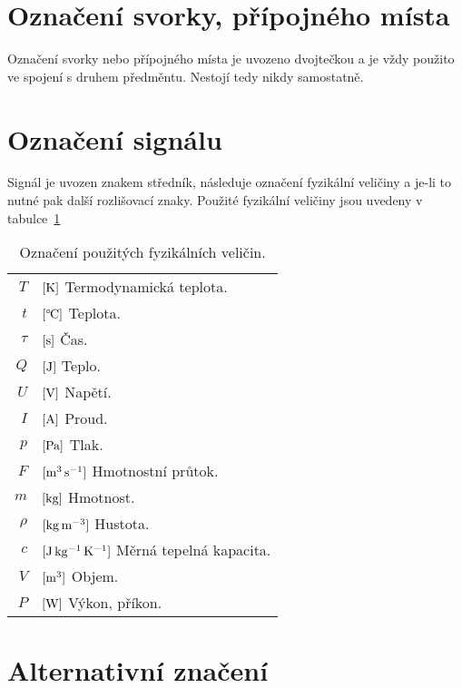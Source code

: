 \documentclass[a4paper,draft]{book}
\def\oC{{{}^\circ\mkern-2mu\rm C}}
\begin{document}
\section{Označení svorky, přípojného místa}

    Označení svorky nebo přípojného místa je uvozeno dvojtečkou a je vždy
    použito ve spojení s druhem předměntu. Nestojí tedy nikdy samostatně.

\section{Označení signálu}

    Signál je uvozen znakem středník, následuje označení fyzikální veličiny
    a je-li to nutné pak další rozlišovací znaky. Použité fyzikální veličiny
    jsou uvedeny v tabulce~\ref{tab:fyzikalni-veliciny}

    \begin{table}[h]
        \centering
        \begin{tabular}{rl}
            $T$ & $[\rm K]$ Termodynamická teplota.\\
            $t$ & $[\oC]$ Teplota.\\
            $\tau$ & $[\rm s]$ Čas.\\
            $Q$ & $[\rm J]$ Teplo.\\
            $U$ & $[\rm V]$ Napětí.\\
            $I$ & $[\rm A]$ Proud.\\
            $p$ & $[\rm Pa]$ Tlak.\\
            $F$ & $[\rm m^3\,s^{-1}]$ Hmotnostní průtok.\\
            $m$ & $[\rm kg]$ Hmotnost.\\
            $\rho$ & $[\rm kg\,m^{-3}]$ Hustota.\\
            $c$ & $[\rm J\,kg^{-1}\,K^{-1}]$ Měrná tepelná kapacita.\\
            $V$ & $[\rm m^3]$ Objem.\\
            $P$ & $[\rm W]$ Výkon, příkon.\\
        \end{tabular}
        \caption{Označení použitých fyzikálních veličin.}
        \label{tab:fyzikalni-veliciny}
    \end{table}

\section{Alternativní značení}
\end{document}
